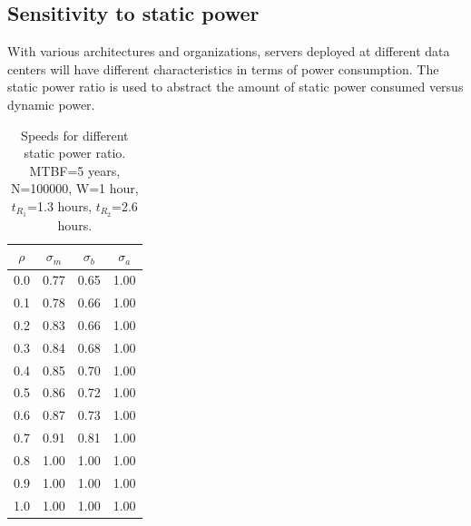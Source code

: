
\subsection{Sensitivity to static power}
\label{subsection_rho}

With various architectures and organizations, servers deployed at
different data centers will have different characteristics in terms of
power consumption. The static power ratio is used to abstract the
amount of static power consumed versus dynamic power.  %

%	
\begin{table}[!h]\small
	\caption{Speeds for different static power ratio. MTBF=5 years, N=100000, W=1 hour, $t_{R_1}$=1.3 hours, $t_{R_2}$=2.6 hours.}
	\centering
		\begin{tabular}{|c|c|c|c|}
		\hline
		$\rho$ & $\sigma_m$ & $\sigma_b$ & $\sigma_a$ \\
		\hline
		0.0 &	0.77 & 	0.65 & 	1.00 \\
		\hline 
		0.1 &	0.78 &	0.66 &	1.00 \\
		\hline
		0.2 &	0.83 &	0.66 &	1.00 \\
		\hline
		0.3	&   0.84 &	0.68 &	1.00 \\
		\hline
		0.4	&   0.85 &	0.70 &	1.00 \\
		\hline
		0.5	&   0.86 &	0.72 &	1.00 \\
		\hline
		0.6	&   0.87 &	0.73 &	1.00 \\
		\hline
		0.7	&	0.91 &	0.81 &	1.00 \\
		\hline
		0.8	& 	1.00 &	1.00 &	1.00 \\
		\hline
		0.9	&	1.00 &	1.00 &	1.00 \\
		\hline
		1.0	&	1.00 &	1.00 &	1.00 \\
		\hline
		\end{tabular}
	\label{tbl:rho}
\end{table}

